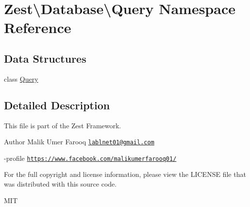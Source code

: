 \hypertarget{namespace_zest_1_1_database_1_1_query}{}\section{Zest\textbackslash{}Database\textbackslash{}Query Namespace Reference}
\label{namespace_zest_1_1_database_1_1_query}
\subsection*{Data Structures}
\begin{DoxyCompactItemize}
\item 
class \mbox{\hyperlink{class_zest_1_1_database_1_1_query_1_1_query}{Query}}
\end{DoxyCompactItemize}


\subsection{Detailed Description}
This file is part of the Zest Framework.

\begin{DoxyAuthor}{Author}
Malik Umer Farooq \href{mailto:lablnet01@gmail.com}{\tt lablnet01@gmail.\+com} 

-\/profile \href{https://www.facebook.com/malikumerfarooq01/}{\tt https\+://www.\+facebook.\+com/malikumerfarooq01/}
\end{DoxyAuthor}
For the full copyright and license information, please view the L\+I\+C\+E\+N\+SE file that was distributed with this source code.

M\+IT 